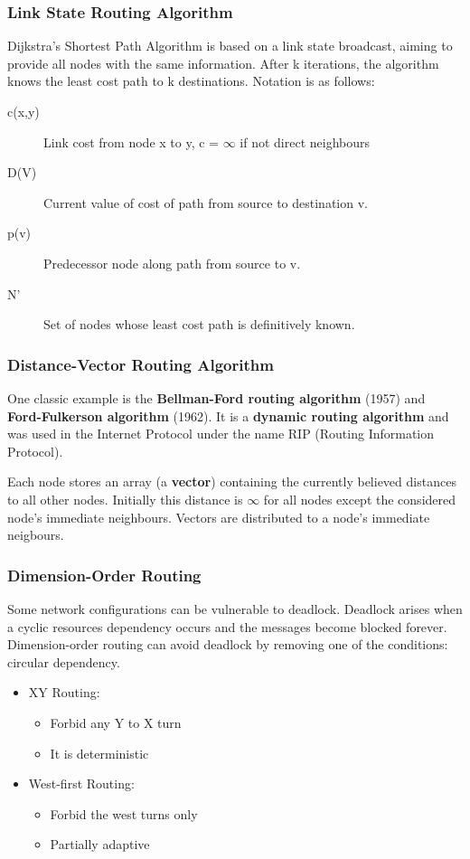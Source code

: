 \documentclass{article}%
\begin{document}
\subsubsection{Link State Routing Algorithm}
\label{sec:orgc9863c3}
Dijkstra's Shortest Path Algorithm is based on a link state broadcast, aiming to provide all nodes with the same information.
After k iterations, the algorithm knows the least cost path to k destinations.
Notation is as follows:
\begin{description}
\item[{c(x,y)}] Link cost from node x to y, c = \(\infty\) if not direct neighbours
\item[{D(V)}] Current value of cost of path from source to destination v.
\item[{p(v)}] Predecessor node along path from source to v.
\item[{N'}] Set of nodes whose least cost path is definitively known.
\end{description}

\subsubsection{Distance-Vector Routing Algorithm}
\label{sec:orgeede7e1}
One classic example is the \textbf{Bellman-Ford routing algorithm} (1957) and \textbf{Ford-Fulkerson algorithm} (1962).
It is a \textbf{dynamic routing algorithm} and was used in the Internet Protocol under the name RIP (Routing Information Protocol).

Each node stores an array (a \textbf{vector}) containing the currently believed distances to all other nodes.
Initially this distance is \(\infty\) for all nodes except the considered node's immediate neighbours.
Vectors are distributed to a node's immediate neigbours.




\subsubsection{Dimension-Order Routing}
\label{sec:org650a32b}
Some network configurations can be vulnerable to deadlock.
Deadlock arises when a cyclic resources dependency occurs and the messages become blocked forever.
Dimension-order routing can avoid deadlock by removing one of the conditions: circular dependency.
\begin{itemize}
\item XY Routing:
\begin{itemize}
\item Forbid any Y to X turn
\item It is deterministic
\end{itemize}
\item West-first Routing:
\begin{itemize}
\item Forbid the west turns only
\item Partially adaptive
\end{itemize}
\end{itemize}
\end{document}
